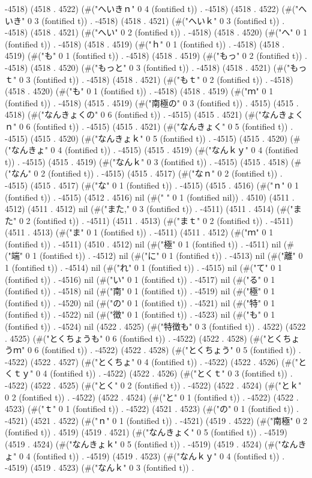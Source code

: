 -4518) (4518 . 4522) (#("へいきｎ" 0 4 (fontified t)) . -4518) (4518 . 4522) (#("へいき" 0 3 (fontified t)) . -4518) (4518 . 4521) (#("へいｋ" 0 3 (fontified t)) . -4518) (4518 . 4521) (#("へい" 0 2 (fontified t)) . -4518) (4518 . 4520) (#("へ" 0 1 (fontified t)) . -4518) (4518 . 4519) (#("ｈ" 0 1 (fontified t)) . -4518) (4518 . 4519) (#("も" 0 1 (fontified t)) . -4518) (4518 . 4519) (#("もっ" 0 2 (fontified t)) . -4518) (4518 . 4520) (#("もっと" 0 3 (fontified t)) . -4518) (4518 . 4521) (#("もっｔ" 0 3 (fontified t)) . -4518) (4518 . 4521) (#("もｔ" 0 2 (fontified t)) . -4518) (4518 . 4520) (#("も" 0 1 (fontified t)) . -4518) (4518 . 4519) (#("ｍ" 0 1 (fontified t)) . -4518) (4515 . 4519) (#("南極の" 0 3 (fontified t)) . 4515) (4515 . 4518) (#("なんきょくの" 0 6 (fontified t)) . -4515) (4515 . 4521) (#("なんきょくｎ" 0 6 (fontified t)) . -4515) (4515 . 4521) (#("なんきょく" 0 5 (fontified t)) . -4515) (4515 . 4520) (#("なんきょｋ" 0 5 (fontified t)) . -4515) (4515 . 4520) (#("なんきょ" 0 4 (fontified t)) . -4515) (4515 . 4519) (#("なんｋｙ" 0 4 (fontified t)) . -4515) (4515 . 4519) (#("なんｋ" 0 3 (fontified t)) . -4515) (4515 . 4518) (#("なん" 0 2 (fontified t)) . -4515) (4515 . 4517) (#("なｎ" 0 2 (fontified t)) . -4515) (4515 . 4517) (#("な" 0 1 (fontified t)) . -4515) (4515 . 4516) (#("ｎ" 0 1 (fontified t)) . -4515) (4512 . 4516) nil (#(" " 0 1 (fontified nil)) . 4510) (4511 . 4512) (4511 . 4512) nil (#("また," 0 3 (fontified t)) . -4511) (4511 . 4514) (#("また" 0 2 (fontified t)) . -4511) (4511 . 4513) (#("まｔ" 0 2 (fontified t)) . -4511) (4511 . 4513) (#("ま" 0 1 (fontified t)) . -4511) (4511 . 4512) (#("ｍ" 0 1 (fontified t)) . -4511) (4510 . 4512) nil (#("極" 0 1 (fontified t)) . -4511) nil (#("端" 0 1 (fontified t)) . -4512) nil (#("に" 0 1 (fontified t)) . -4513) nil (#("離" 0 1 (fontified t)) . -4514) nil (#("れ" 0 1 (fontified t)) . -4515) nil (#("て" 0 1 (fontified t)) . -4516) nil (#("い" 0 1 (fontified t)) . -4517) nil (#("る" 0 1 (fontified t)) . -4518) nil (#("南" 0 1 (fontified t)) . -4519) nil (#("極" 0 1 (fontified t)) . -4520) nil (#("の" 0 1 (fontified t)) . -4521) nil (#("特" 0 1 (fontified t)) . -4522) nil (#("徴" 0 1 (fontified t)) . -4523) nil (#("も" 0 1 (fontified t)) . -4524) nil (4522 . 4525) (#("特徴も" 0 3 (fontified t)) . 4522) (4522 . 4525) (#("とくちょうも" 0 6 (fontified t)) . -4522) (4522 . 4528) (#("とくちょうｍ" 0 6 (fontified t)) . -4522) (4522 . 4528) (#("とくちょう" 0 5 (fontified t)) . -4522) (4522 . 4527) (#("とくちょ" 0 4 (fontified t)) . -4522) (4522 . 4526) (#("とくｔｙ" 0 4 (fontified t)) . -4522) (4522 . 4526) (#("とくｔ" 0 3 (fontified t)) . -4522) (4522 . 4525) (#("とく" 0 2 (fontified t)) . -4522) (4522 . 4524) (#("とｋ" 0 2 (fontified t)) . -4522) (4522 . 4524) (#("と" 0 1 (fontified t)) . -4522) (4522 . 4523) (#("ｔ" 0 1 (fontified t)) . -4522) (4521 . 4523) (#("の" 0 1 (fontified t)) . -4521) (4521 . 4522) (#("ｎ" 0 1 (fontified t)) . -4521) (4519 . 4522) (#("南極" 0 2 (fontified t)) . 4519) (4519 . 4521) (#("なんきょく" 0 5 (fontified t)) . -4519) (4519 . 4524) (#("なんきょｋ" 0 5 (fontified t)) . -4519) (4519 . 4524) (#("なんきょ" 0 4 (fontified t)) . -4519) (4519 . 4523) (#("なんｋｙ" 0 4 (fontified t)) . -4519) (4519 . 4523) (#("なんｋ" 0 3 (fontified t)) . 